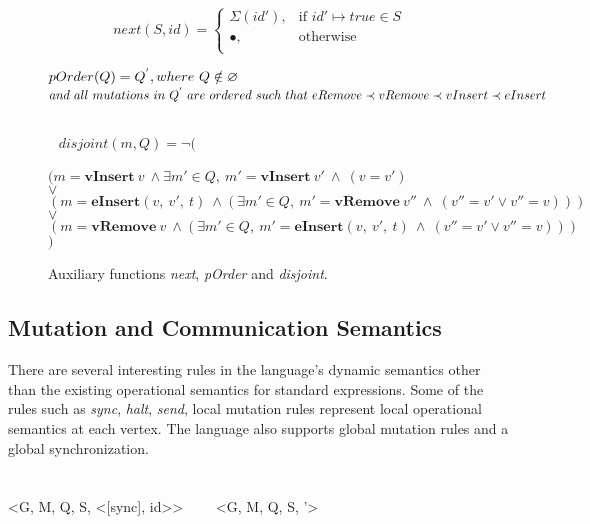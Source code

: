 \begin{figure}[h]
\begin{center}
\[
    next(S, id)= 
\begin{cases}
    \Sigma(id'), & \text{if } id' \mapsto true \in S\\
    \bullet,              & \text{otherwise}\\
\end{cases}
\]

$\begin{array}{@{}l@{~}l@{\quad}l@{\!\!\!\!\!\!}r}
 pOrder(Q) = Q^{'}, where~Q \notin \varnothing
\end{array}
$
$\begin{array}{@{}l@{~}l@{\quad}l@{\!\!\!\!\!\!}r}
and~all~mutations~in~Q^{'}~are~ordered~such~that~eRemove \prec vRemove \prec vInsert \prec eInsert\\ 
\end{array}
$

$\begin{array}{@{}l@{~}l@{\quad}l@{\!\!\!\!\!\!}r}
\\
\\
\\
\end{array}
$
$disjoint(m, Q) = \neg($\\
$(m = \textbf{vInsert}~v~\wedge \exists m' \in Q,~m' = \textbf{vInsert}~v'~\wedge~(v=v')$\\
$\vee $\\
$(m = \textbf{eInsert} (v,~v',~t)~\wedge (\exists m' \in Q,~m' = \textbf{vRemove}~v''~\wedge~(v''=v'\vee v'' = v)))$\\
$\vee $\\
$(m = \textbf{vRemove}~v~\wedge (\exists m' \in Q,~m' = \textbf{eInsert} (v,~v',~t)~\wedge~(v''=v'\vee v'' = v)))$\\
$)$


\end{center}
\caption{Auxiliary functions \emph{next}, \emph{pOrder} and \emph{disjoint}.}
\label{fig-auxFunc}
\end{figure}

\subsection{Mutation and Communication Semantics}
\label{subsec:dom}

There are several interesting rules in the language's dynamic semantics other than the existing operational semantics for standard expressions. Some of the rules such as \emph{sync}, \emph{halt}, \emph{send}, local mutation rules represent local operational semantics at each vertex. The language also supports global mutation rules and a global synchronization.\\
\ \\
\ \\
{<G, M, Q, S, \Sigma <[sync], id>> \ \ \reducesto \ \ <G, M, Q, S, \Sigma '>}

